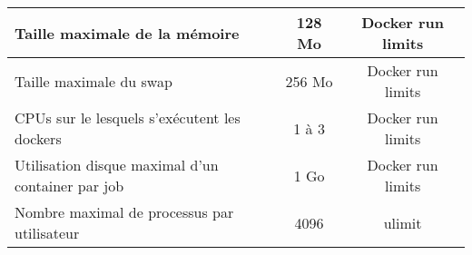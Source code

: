 \begin{center}
\begin{tabular}{| L{8cm} | c | c |}
		Taille maximale de la mémoire & 128 Mo & Docker run limits \\ \hline %
		Taille maximale du swap & 256 Mo & Docker run limits \\ \hline %
		CPUs sur le lesquels s'exécutent les dockers & 1 à 3 & Docker run limits \\ \hline %
		Utilisation disque maximal d'un container par job & 1 Go & Docker run limits \\ \hline %
		Nombre maximal de processus par utilisateur & 4096 & ulimit \\ \hline %
	\end{tabular}
\end{center}
